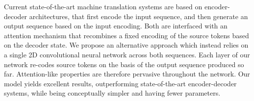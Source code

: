 Current state-of-the-art machine translation systems are based on encoder-decoder architectures, that first encode the input sequence, and then generate an output sequence based on the input encoding. Both are interfaced with an attention mechanism that recombines a fixed encoding of the source tokens based on the decoder state. We propose an alternative approach which instead relies on a single 2D convolutional neural network across both sequences. Each layer of our network re-codes source tokens on the basis of the output sequence produced so far. Attention-like properties are therefore pervasive throughout the network. Our model yields excellent results, outperforming state-of-the-art encoder-decoder systems, while being conceptually simpler and having fewer parameters.
